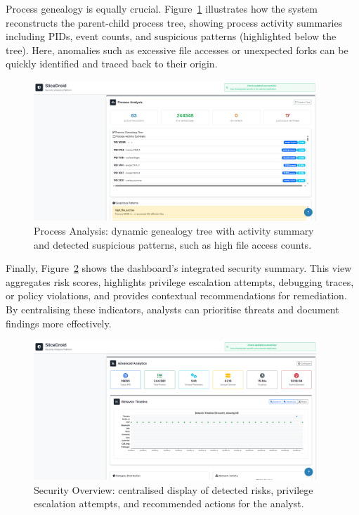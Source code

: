 \documentclass[a4paper,12pt]{report}
\begin{document}
Process genealogy is equally crucial. Figure~\ref{fig:process_tree} illustrates how the system reconstructs the parent-child process tree, showing process activity summaries including PIDs, event counts, and suspicious patterns (highlighted below the tree). Here, anomalies such as excessive file accesses or unexpected forks can be quickly identified and traced back to their origin.

\begin{figure}[H]
\centering
\includegraphics[width=0.95\textwidth]{process_tree.png}
\caption{Process Analysis: dynamic genealogy tree with activity summary and detected suspicious patterns, such as high file access counts.}
\label{fig:process_tree}
\end{figure}

Finally, Figure~\ref{fig:security_overview} shows the dashboard’s integrated security summary. This view aggregates risk scores, highlights privilege escalation attempts, debugging traces, or policy violations, and provides contextual recommendations for remediation. By centralising these indicators, analysts can prioritise threats and document findings more effectively.

\begin{figure}[H]
\centering
\includegraphics[width=0.95\textwidth]{security_overview.png}
\caption{Security Overview: centralised display of detected risks, privilege escalation attempts, and recommended actions for the analyst.}
\label{fig:security_overview}
\end{figure}
\end{document}
